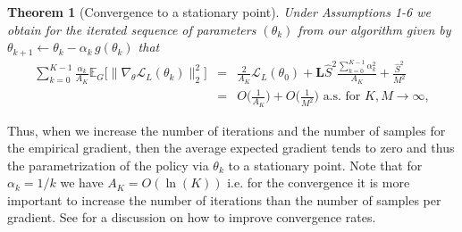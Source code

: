 \documentclass[reqno, 11pt]{amsart}%
\newcommand\cL{\mathcal L}
\newcommand\EE{\mathbb E}
\newtheorem{theorem}{Theorem}
\theoremstyle{definition}
\begin{document}
\begin{theorem}[Convergence to a stationary point]
\label{thm:conv-discrete} Under Assumptions 1-6 we obtain for the iterated sequence of parameters $(\theta_k)$ from our algorithm given by $\theta_{k+1} \leftarrow \theta_k - \alpha_k \, g(\theta_k)$ that 
\begin{eqnarray}\label{eq:prob-bound-good}
\sum_{k=0}^{K-1}\frac{\alpha_k}{A_K}  \EE_G\Big[\|\nabla_\theta \cL_L(\theta_k)\|_2^2 \Big] &=& \frac{2}{A_K} \cL_L(\theta_0)+ \mathbf{L} \hat{S}^2  \frac{\sum_{k=0}^{K-1} \alpha_k^2}{A_K} + \frac{\hat{S}^2}{M^2}   \\
&=&O\Big(\frac{1}{A_K}\Big)+O\Big(\frac{1}{M^2}\Big)  \mbox{ a.s. for }K,M\to \infty,
\end{eqnarray}
\end{theorem}

Thus, when we increase the number of iterations and the number of samples for the empirical gradient, then the average expected gradient tends to zero and thus the parametrization of the policy via $\theta_k$ to a stationary point. Note that for $\alpha_k=1/k$ we have $A_K=O(\ln(K))$ i.e. for the convergence it is more important to increase the number of iterations than the number of samples per gradient. See \cite{Liu2023HighProbSGD} for a discussion on how to improve convergence rates. \\
\end{document}
